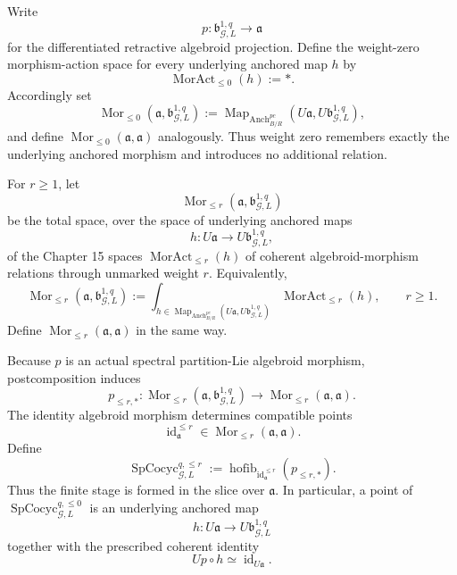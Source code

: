 \begin{construction}
\label{constr:symmetry-noether-universal-finite-weight-splitting-tower}
Write
\[
p:
\mathfrak b_{\mathcal G,L}^{1,q}
\longrightarrow
\mathfrak a
\]
for the differentiated retractive algebroid projection.  Define the weight-zero
morphism-action space for every underlying anchored map $h$ by
\[
\boxed{
\operatorname{MorAct}_{\le0}(h):=*.
}
\]
Accordingly set
\[
\boxed{
\operatorname{Mor}_{\le0}(\mathfrak a,\mathfrak b_{\mathcal G,L}^{1,q})
:=
\operatorname{Map}_{\operatorname{Anch}^{pc}_{B/R}}
(U\mathfrak a,U\mathfrak b_{\mathcal G,L}^{1,q}),
}
\]
and define $\operatorname{Mor}_{\le0}(\mathfrak a,\mathfrak a)$ analogously.  Thus
weight zero remembers exactly the underlying anchored morphism and introduces no
additional relation.

For $r\ge1$, let
\[
\operatorname{Mor}_{\le r}(\mathfrak a,\mathfrak b_{\mathcal G,L}^{1,q})
\]
be the total space, over the space of underlying anchored maps
\[
h:
U\mathfrak a
\longrightarrow
U\mathfrak b_{\mathcal G,L}^{1,q},
\]
of the Chapter 15 spaces $\operatorname{MorAct}_{\le r}(h)$ of coherent
algebroid-morphism relations through unmarked weight $r$.  Equivalently,
\[
\operatorname{Mor}_{\le r}(\mathfrak a,\mathfrak b_{\mathcal G,L}^{1,q})
:=
\int_{
h\in
\operatorname{Map}_{\operatorname{Anch}^{pc}_{B/R}}
(U\mathfrak a,U\mathfrak b_{\mathcal G,L}^{1,q})
}
\operatorname{MorAct}_{\le r}(h),
\qquad r\ge1.
\]
Define $\operatorname{Mor}_{\le r}(\mathfrak a,\mathfrak a)$ in the same way.

Because $p$ is an actual spectral partition-Lie algebroid morphism,
postcomposition induces
\[
p_{\le r,*}:
\operatorname{Mor}_{\le r}(\mathfrak a,\mathfrak b_{\mathcal G,L}^{1,q})
\longrightarrow
\operatorname{Mor}_{\le r}(\mathfrak a,\mathfrak a).
\]
The identity algebroid morphism determines compatible points
\[
\operatorname{id}_{\mathfrak a}^{\le r}
\in
\operatorname{Mor}_{\le r}(\mathfrak a,\mathfrak a).
\]
Define
\[
\boxed{
\operatorname{SpCocyc}_{\mathcal G,L}^{q,\le r}
:=
\operatorname{hofib}_{\operatorname{id}_{\mathfrak a}^{\le r}}
\left(
p_{\le r,*}
\right).
}
\]
Thus the finite stage is formed in the slice over $\mathfrak a$.  In particular,
a point of $\operatorname{SpCocyc}_{\mathcal G,L}^{q,\le0}$ is an underlying
anchored map
\[
h:
U\mathfrak a
\longrightarrow
U\mathfrak b_{\mathcal G,L}^{1,q}
\]
together with the prescribed coherent identity
\[
Up\circ h\simeq\operatorname{id}_{U\mathfrak a}.
\]


\end{construction}
